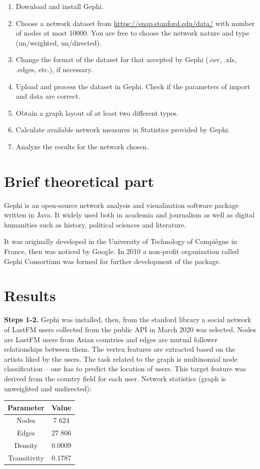 \documentclass[12pt, a4paper]{article}
\begin{document}
\begin{enumerate}
	\item Download and install Gephi.
	\item Choose a network dataset from \url{https://snap.stanford.edu/data/} with number of nodes at most 10000. You are free to choose the network nature and type (un/weighted, un/directed).
	\item Change the format of the dataset for that accepted by Gephi (.csv, .xls, .edges, etc.), if necessary.
	\item Upload and process the dataset in Gephi. Check if the parameters of import and data are correct.
	\item Obtain a graph layout of at least two different types.
	\item Calculate available network measures in Statistics provided by Gephi.
	\item Analyze the results for the network chosen.
\end{enumerate}

\section*{Brief theoretical part}

Gephi is an open-source network analysis and visualization software package written in Java. It widely used both in academia and journalism as well as digital humanities such as history, political sciences and literature.

It was originally developed in the University of Technology of Compi{\`e}gne in France, then was noticed by Google. In 2010 a non-profit organization called Gephi Consortium was formed for further development of the package.

\section*{Results}

\textbf{Steps 1-2.} Gephi was installed, then, from the stanford library a social network of LastFM users collected from the public API in March 2020 was selected. Nodes are LastFM users from Asian countries and edges are mutual follower relationships between them. The vertex features are extracted based on the artists liked by the users. The task related to the graph is multinomial node classification -- one has to predict the location of users. This target feature was derived from the country field for each user. Network statistics (graph is unweighted and undirected):
\begin{center}
\begin{tabular}{cc}
	\hline
	Parameter & Value \\ \hline
	Nodes & 7 624 \\
	Edges & 27 806 \\
	Density & 0.0009 \\
	Transitivity & 0.1787 \\ \hline
\end{tabular}
\end{center}
\end{document}
